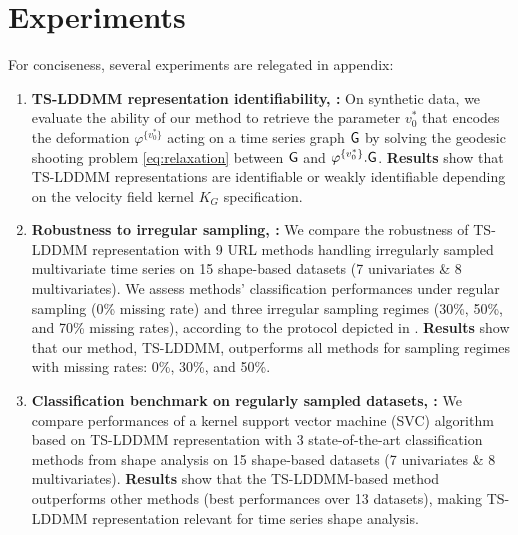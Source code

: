 \section{Experiments}
\vspace{-1ex}
\label{section:experiments}
For conciseness, several experiments are relegated in appendix: 

\begin{enumerate}
    \item \textbf{TS-LDDMM representation identifiability, :} On synthetic data, we evaluate the ability of our method to retrieve the parameter $v_0^*$ that encodes the deformation $\varphi^{\{v_0^*\}}$ acting on a time series graph $\mathsf{G}$ by solving the geodesic shooting problem \eqref{eq:relaxation} between $\mathsf{G}$ and $\varphi^{\{v_0^*\}}.\mathsf{G}$.
     \textbf{Results} show that TS-LDDMM representations are identifiable or weakly identifiable depending on the velocity field kernel $K_G$ specification.
  
    \item \textbf{Robustness to irregular sampling, :} We compare the robustness of TS-LDDMM representation with 9 URL methods handling irregularly sampled multivariate time series on 15 shape-based datasets (7 univariates \& 8 multivariates).
     We assess methods' classification performances under regular sampling (0\% missing rate) and three irregular sampling regimes (30\%, 50\%, and 70\% missing rates), according to the protocol depicted in \cite{kidger2020neural}.
      \textbf{Results} show that our method, TS-LDDMM, outperforms all methods for sampling regimes with missing rates: 0\%, 30\%, and 50\%.
    
    \item \textbf{Classification benchmark on regularly sampled datasets, :} We compare performances of a kernel support vector machine (SVC) algorithm based on TS-LDDMM representation with 3 state-of-the-art classification methods from shape analysis on 15 shape-based datasets (7 univariates \& 8 multivariates). \textbf{Results} show that the TS-LDDMM-based method outperforms other methods (best performances over 13 datasets), making TS-LDDMM representation relevant for time series shape analysis.
\end{enumerate}

